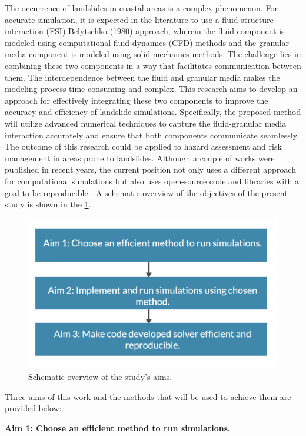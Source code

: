 The occurrence of landslides in coastal areas is a complex phenomenon. For accurate simulation, it is expected in the literature to use a fluid-structure interaction (\ac{FSI}) Belytschko (1980)\cite{belytschko1980fsi} approach, wherein the fluid component is modeled using computational fluid dynamics (CFD) methods and the granular media component is modeled using solid mechanics methods. The challenge lies in combining these two components in a way that facilitates communication between them. The interdependence between the fluid and granular media makes the modeling process time-consuming and complex. This research aims to develop an approach for effectively integrating these two components to improve the accuracy and efficiency of landslide simulations. Specifically, the proposed method will utilize advanced numerical techniques to capture the fluid-granular media interaction accurately and ensure that both components communicate seamlessly. The outcome of this research could be applied to hazard assessment and risk management in areas prone to landslides. Although a couple of works were published in recent years, the current position not only uses a different approach for computational simulations but also uses open-source code and libraries with a goal to be reproducible \cite{NAS2019}. A schematic overview of the objectives of the present study is shown in the \ref{fig:aims}.

\begin{figure}[!ht]
    \centering
    \includegraphics[width=12cm]{Images/chap1/Aims.png}
    \caption{Schematic overview of the study's aims.}
    \label{fig:aims}
\end{figure}
Three aims of this work and the methods that will be used to achieve them are provided below:

\textbf{Aim 1: Choose an efficient method to run simulations.}

